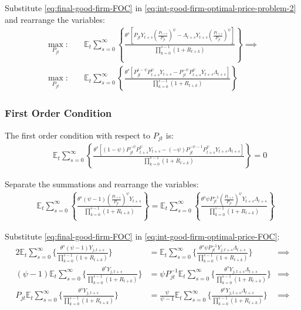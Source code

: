 \documentclass[
	12pt, 
	]{article}
\numberwithin{equation}{section}
\newcommand{\E}[1][t]{{\mathbb{E}_{#1}}}
\theoremstyle{definition}
\theoremstyle{plain}
\theoremstyle{plain}
\theoremstyle{plain}
\begin{document}
Substitute \ref{eq:final-good-firm-FOC} in \ref{eq:int-good-firm-optimal-price-problem-2} and rearrange the variables:
\begin{align}
	\max_{P_{jt}}: & \quad \E \sum_{s=0}^{\infty} \left\{ \frac{\theta^s \left[ P_{jt} Y_{t+s} \left( \frac{P_{t+s}}{P_{jt}} \right)^{\psi} - \Lambda_{t+s} Y_{t+s} \left( \frac{P_{t+s}}{P_{jt}} \right)^{\psi} \right] }{\prod_{k=0}^{s-1}(1+R_{t+k})} \right\} \implies \nonumber 
\\
	\max_{P_{jt}}: & \quad \E \sum_{s=0}^{\infty} \left\{ \frac{\theta^s \left[ P_{jt}^{1-\psi} P_{t+s}^{\psi} Y_{t+s} - P_{jt}^{-\psi} P_{t+s}^{\psi} Y_{t+s} \Lambda_{t+s} \right] }{\prod_{k=0}^{s-1}(1+R_{t+k})} \right\} \nonumber
\end{align}


\subsubsection*{First Order Condition}

The first order condition with respect to $P_{jt}$ is:
\begin{align}
	& \quad \E \sum_{s=0}^{\infty} \left\{ \frac{\theta^s \left[ (1-\psi) P_{jt}^{-\psi} P_{t+s}^{\psi} Y_{t+s} - (-\psi) P_{jt}^{-\psi-1} P_{t+s}^{\psi} Y_{t+s} \Lambda_{t+s} \right] }{\prod_{k=0}^{s-1}(1+R_{t+k})} \right\} = 0 \nonumber
\end{align}


Separate the summations and rearrange the variables:
\begin{align}
\label{eq:int-good-firm-optimal-price-FOC}
	& \E \sum_{s=0}^{\infty} \left\{ \frac{\theta^s (\psi-1) \left( \frac{P_{t+s}} {P_{jt}} \right)^{\psi} Y_{t+s}} {\prod_{k=0}^{s-1} (1+R_{t+k})} \right\} = \E \sum_{s=0}^{\infty} \left\{ \frac{\theta^s \psi P_{jt}^{-1} \left( \frac{P_{t+s}} {P_{jt}} \right)^{\psi} Y_{t+s} \Lambda_{t+s} }{\prod_{k=0}^{s-1}(1+R_{t+k})} \right\}
\end{align}


Substitute \ref{eq:final-good-firm-FOC} in \ref{eq:int-good-firm-optimal-price-FOC}:
\begin{alignat}{2}
	\E \sum_{s=0}^{\infty} \Bigg\{ \frac{\theta^s (\psi-1) Y_{j,t+s}}{\prod_{k=0}^{s-1}(1+R_{t+k})} \Bigg\} &= \E \sum_{s=0}^{\infty} \Bigg\{ \frac{\theta^s \psi P_{jt}^{-1} Y_{j,t+s} \Lambda_{t+s}}{\prod_{k=0}^{s-1}(1+R_{t+k})}  \Bigg\} &\implies \nonumber \\
	(\psi-1) \E \sum_{s=0}^{\infty} \Bigg\{ \frac{\theta^s Y_{j,t+s}}{\prod_{k=0}^{s-1}(1+R_{t+k})} \Bigg\} &= \psi P_{jt}^{-1} \E \sum_{s=0}^{\infty} \Bigg\{ \frac{\theta^s Y_{j,t+s} \Lambda_{t+s}}{\prod_{k=0}^{s-1}(1+R_{t+k})}  \Bigg\} &\implies \nonumber \\
	P_{jt} \E \sum_{s=0}^{\infty} \Bigg\{ \frac{\theta^s Y_{j,t+s}}{\prod_{k=0}^{s-1}(1+R_{t+k})} \Bigg\} &= \frac{\psi}{\psi-1} \E \sum_{s=0}^{\infty} \Bigg\{ \frac{\theta^s Y_{j,t+s} \Lambda_{t+s}}{\prod_{k=0}^{s-1}(1+R_{t+k})}  \Bigg\} &\implies \nonumber
\end{alignat}
\end{document}
